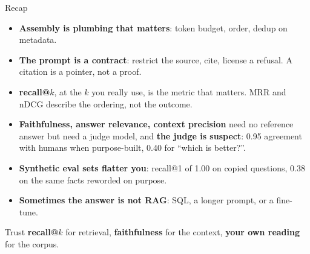\documentclass[aspectratio=169]{beamer}
\newcommand{\takebox}[1]{%
  \begin{tcolorbox}[colback=paramgreen!8, colframe=paramgreen, boxrule=0.6pt, arc=2pt]
  #1
  \end{tcolorbox}}
\begin{document}
\begin{frame}{Recap}
  \small
  \begin{itemize}
    \item \textbf{Assembly is plumbing that matters}: token budget, order, dedup on metadata.
    \item \textbf{The prompt is a contract}: restrict the source, cite, license a refusal.
      A citation is a pointer, not a proof.
    \item \textbf{recall@$k$}, at the $k$ you really use, is the metric that matters. MRR
      and nDCG describe the ordering, not the outcome.
    \item \textbf{Faithfulness, answer relevance, context precision} need no reference answer
      but need a judge model, and \textbf{the judge is suspect}: 0.95 agreement with humans
      when purpose-built, 0.40 for ``which is better?''.
    \item \textbf{Synthetic eval sets flatter you}: recall@1 of 1.00 on copied questions,
      0.38 on the same facts reworded on purpose.
    \item \textbf{Sometimes the answer is not RAG}: SQL, a longer prompt, or a fine-tune.
  \end{itemize}

  \takebox{\small Trust \textbf{recall@$k$} for retrieval, \textbf{faithfulness} for the context,
  \textbf{your own reading} for the corpus.}
\end{frame}
\end{document}
